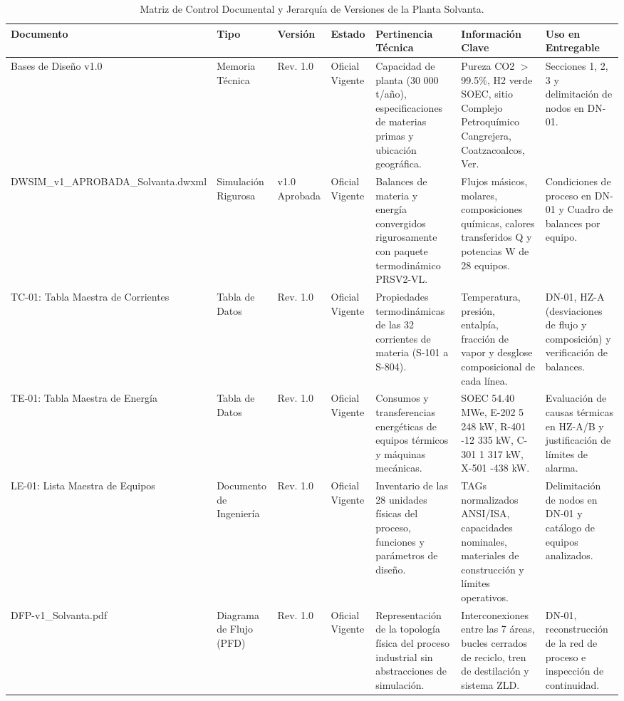 \documentclass[10pt,letterpaper]{article}
\begin{document}
\begin{table}[H]
\centering\footnotesize
\caption{Matriz de Control Documental y Jerarquía de Versiones de la Planta Solvanta.} \label{tab:matriz_ctrl_doc}
\begin{tabularx}{\textwidth}{|p{2.6cm}|p{2.0cm}|p{1.4cm}|p{1.8cm}|X|X|p{2.2cm}|}
\hline
\rowcolor{tableheader}\color{white}\textbf{Documento} & \color{white}\textbf{Tipo} & \color{white}\textbf{Versión} & \color{white}\textbf{Estado} & \color{white}\textbf{Pertinencia Técnica} & \color{white}\textbf{Información Clave} & \color{white}\textbf{Uso en Entregable} \\ \hline
Bases de Diseño v1.0 & Memoria Técnica & Rev. 1.0 & Oficial Vigente & Capacidad de planta (30 000 t/año), especificaciones de materias primas y ubicación geográfica. & Pureza CO2 $>$99.5\%, H2 verde SOEC, sitio Complejo Petroquímico Cangrejera, Coatzacoalcos, Ver. & Secciones 1, 2, 3 y delimitación de nodos en DN-01. \\ \hline
DWSIM\_v1\_APROBADA\_Solvanta.dwxml & Simulación Rigurosa & v1.0 Aprobada & Oficial Vigente & Balances de materia y energía convergidos rigurosamente con paquete termodinámico PRSV2-VL. & Flujos másicos, molares, composiciones químicas, calores transferidos Q y potencias W de 28 equipos. & Condiciones de proceso en DN-01 y Cuadro de balances por equipo. \\ \hline
TC-01: Tabla Maestra de Corrientes & Tabla de Datos & Rev. 1.0 & Oficial Vigente & Propiedades termodinámicas de las 32 corrientes de materia (S-101 a S-804). & Temperatura, presión, entalpía, fracción de vapor y desglose composicional de cada línea. & DN-01, HZ-A (desviaciones de flujo y composición) y verificación de balances. \\ \hline
TE-01: Tabla Maestra de Energía & Tabla de Datos & Rev. 1.0 & Oficial Vigente & Consumos y transferencias energéticas de equipos térmicos y máquinas mecánicas. & SOEC 54.40 MWe, E-202 5 248 kW, R-401 -12 335 kW, C-301 1 317 kW, X-501 -438 kW. & Evaluación de causas térmicas en HZ-A/B y justificación de límites de alarma. \\ \hline
LE-01: Lista Maestra de Equipos & Documento de Ingeniería & Rev. 1.0 & Oficial Vigente & Inventario de las 28 unidades físicas del proceso, funciones y parámetros de diseño. & TAGs normalizados ANSI/ISA, capacidades nominales, materiales de construcción y límites operativos. & Delimitación de nodos en DN-01 y catálogo de equipos analizados. \\ \hline
DFP-v1\_Solvanta.pdf & Diagrama de Flujo (PFD) & Rev. 1.0 & Oficial Vigente & Representación de la topología física del proceso industrial sin abstracciones de simulación. & Interconexiones entre las 7 áreas, bucles cerrados de reciclo, tren de destilación y sistema ZLD. & DN-01, reconstrucción de la red de proceso e inspección de continuidad. \\ \hline

\end{tabularx}
\end{table}
\end{document}
